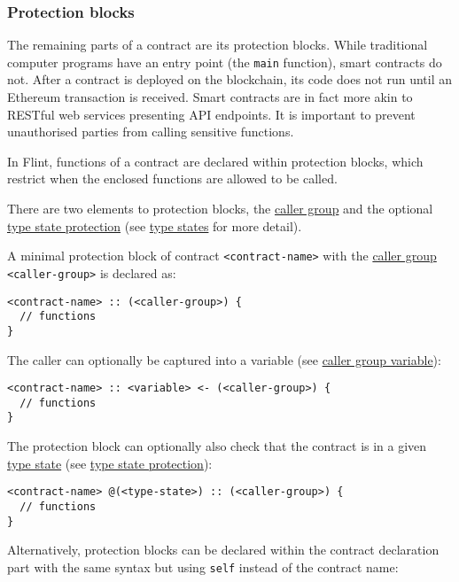 \subsubsection{Protection blocks}
\label{sec:appendix-b-protection-blocks}

The remaining parts of a contract are its protection blocks. While traditional computer programs have an entry point (the \texttt{main} function), smart contracts do not. After a contract is deployed on the blockchain, its code does not run until an Ethereum transaction is received. Smart contracts are in fact more akin to RESTful web services presenting API endpoints. It is important to prevent unauthorised parties from calling sensitive functions.

In Flint, functions of a contract are declared within protection blocks, which restrict when the enclosed functions are allowed to be called.

There are two elements to protection blocks, the \hyperref[sec:appendix-b-caller-group]{caller group} and the optional \hyperref[sec:appendix-b-type-state-protection]{type state protection} (see \hyperref[sec:appendix-b-type-states]{type states} for more detail).

A minimal protection block of contract \texttt{<contract-name>} with the \hyperref[sec:appendix-b-caller-group]{caller group} \texttt{<caller-group>} is declared as:

\begin{verbatim}
<contract-name> :: (<caller-group>) {
  // functions
}
\end{verbatim}

The caller can optionally be captured into a variable (see \hyperref[sec:appendix-b-caller-group-variable]{caller group variable}):

\begin{verbatim}
<contract-name> :: <variable> <- (<caller-group>) {
  // functions
}
\end{verbatim}

The protection block can optionally also check that the contract is in a given \hyperref[sec:appendix-b-type-states]{type state} (see \hyperref[sec:appendix-b-type-state-protection]{type state protection}):

\begin{verbatim}
<contract-name> @(<type-state>) :: (<caller-group>) {
  // functions
}
\end{verbatim}

Alternatively, protection blocks can be declared within the contract declaration part with the same syntax but using \texttt{self} instead of the contract name:

